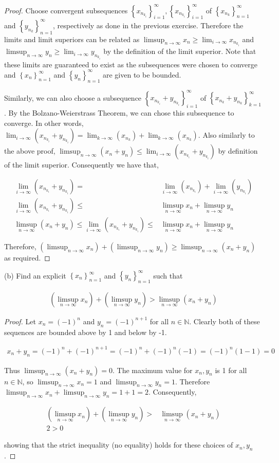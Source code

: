 \documentclass[12pt]{article}
\newcommand{\limtoinf}[1][n]{\lim_{ {#1} \to \infty}}
\newcommand{\limsuptoinf}[1][n]{\limsup_{ {#1} \to \infty}}
\newcommand{\seq}[2][n]{\left\{ {#2} \right\}_{#1=1}^\infty}
\newcommand{\paren}[1]{\left( {#1} \right)}
\newcommand{\bN}{\mathbb{N}}
\begin{document}
\begin{proof}
	Choose convergent subsequences $\seq[i]{x_{n_{k_i}}}, \seq[i]{x_{n_{k_i}}}$ of $\seq{x_{n_k}}$ and $\seq{y_{n_k}}$, respectively as done in the previous exercise. Therefore the limits and limit superiors can be related as $\limsuptoinf{x_n}\ge\limtoinf[i]{x_{n_{k_i}}}$ and $\limsuptoinf{y_n}\ge\limtoinf[i]{y_{n_{k_i}}}$ by the definition of the limit superior. Note that these limits are guaranteed to exist as the subsequences were chosen to converge and $\seq{x_n}$ and $\seq{y_n}$ are given to be bounded.
	
\indent Similarly, we can also choose a subsequence $\seq[i]{x_{n_{k_i}}+y_{n_{k_i}}}$ of $\seq[k]{x_{n_{k}}+y_{n_{k}}}$. By the Bolzano-Weierstrass Theorem, we can chose this subsequence to converge. In other words, $\limtoinf[i]\paren{x_{n_{k_i}}+y_{n_{k_i}}}=\limtoinf[k]\paren{x_{n_k}}+\limtoinf[k]\paren{x_{n_k}}$. Also similarly to the above proof, $\limsuptoinf\paren{x_n+y_n}\le\limtoinf[i]\paren{x_{n_{k_i}}+y_{n_{k_i}}}$ by definition of the limit superior. Consequently we have that,

\begin{align*}
	\limtoinf[i]\paren{x_{n_{k_i}}+y_{n_{k_i}}}=&\limtoinf[i]\paren{x_{n_{k_i}}} + \limtoinf[i]\paren{y_{n_{k_i}}} \\
	\limtoinf[i]\paren{x_{n_{k_i}}+y_{n_{k_i}}}\le&\limsuptoinf x_n +\limsuptoinf y_n \\
	\limsuptoinf\paren{x_n+y_n}\le\limtoinf[i]\paren{x_{n_{k_i}}+y_{n_{k_i}}}\le&\limsuptoinf x_n +\limsuptoinf y_n
\end{align*}

\noindent Therefore, $\paren{\limsuptoinf x_n}+\paren{\limsuptoinf y_n}\ge\limsuptoinf\paren{x_n+y_n}$ as required.
\end{proof}

(b) Find an explicit $\seq{x_n}$ and $\seq{y_n}$ such that

\begin{align*}
	\paren{\limsuptoinf x_n}+\paren{\limsuptoinf y_n}>\limsuptoinf\paren{x_n+y_n}
\end{align*}

\begin{proof}
	Let $x_n=(-1)^n$ and $y_n=(-1)^{n+1}$ for all $n\in\bN$. Clearly both of these sequences are bounded above by 1 and below by -1.
	
\begin{align*}
	x_n+y_n=(-1)^n+(-1)^{n+1}=(-1)^n+(-1)^n(-1)=(-1)^n(1-1)=0
\end{align*}

Thus $\limsuptoinf\paren{x_n+y_n}=0$. The maximum value for $x_n, y_n$ is 1 for all $n\in\bN$, so $\limsuptoinf x_n=1$ and $\limsuptoinf y_n=1$. Therefore $\limsuptoinf x_n+\limsuptoinf y_n=1+1=2$. Consequently,

\begin{align*}
	\paren{\limsuptoinf x_n}+\paren{\limsuptoinf y_n}>&\limsuptoinf\paren{x_n+y_n} \\
	2>0
\end{align*}

\noindent showing that the strict inequality (no equality) holds for these choices of $x_n,y_n$.
\end{proof}
\end{document}
